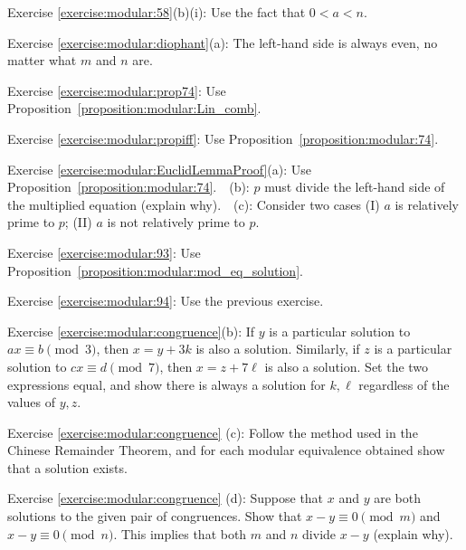 \noindent Exercise \ref{exercise:modular:58}(b)(i): Use the fact that $0 < a < n$.

\noindent Exercise \ref{exercise:modular:diophant}(a): The left-hand side is always even, no matter what $m$ and $n$ are.

\noindent Exercise \ref{exercise:modular:prop74}: Use Proposition~\ref{proposition:modular:Lin_comb}.

\noindent Exercise \ref{exercise:modular:propiff}: Use Proposition~\ref{proposition:modular:74}.

\noindent Exercise \ref{exercise:modular:EuclidLemmaProof}(a): Use  Proposition~\ref{proposition:modular:74}.~~(b): $p$ must divide the left-hand side of the multiplied equation (explain why).~~(c): Consider two cases (I) $a$ is relatively prime to $p$; (II) $a$ is not relatively prime to $p$.

\noindent Exercise \ref{exercise:modular:93}: Use Proposition~\ref{proposition:modular:mod_eq_solution}. 

\noindent Exercise \ref{exercise:modular:94}: Use the previous exercise.

\noindent Exercise \ref{exercise:modular:congruence}(b):  If  $y$ is a particular solution to $ax \equiv b \pmod 3$, then $x=y+3k$ is also a solution. Similarly, if $z$ is 
 a particular solution to $cx \equiv d \pmod 7$, then $x=z+7\ell$ is also a solution. Set the two expressions equal, and show there is always a solution for $k, \ell$ regardless of the values of $y,z$.

\noindent Exercise \ref{exercise:modular:congruence}  (c): Follow the method used in the Chinese Remainder Theorem, and for each modular equivalence obtained show that a solution exists.

\noindent Exercise \ref{exercise:modular:congruence}  (d): Suppose that $x$ and $y$ are both solutions to the given pair of congruences. Show that 
$ x-y \equiv 0 \pmod{m}$ and $x-y \equiv 0 \pmod{n}$. This implies that both $m$ and $n$ divide $x-y$ (explain why).